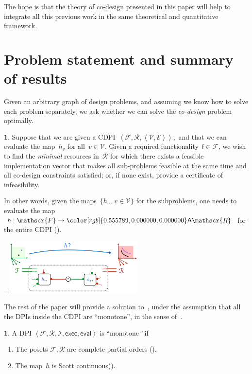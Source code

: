\documentclass[twocolumn,english]{IEEEtran}
\theoremstyle{definition}
\newtheorem{defn}{\protect\definitionname}
\theoremstyle{plain}
\theoremstyle{definition}
\theoremstyle{remark}
\theoremstyle{definition}
\newtheorem{problem}{\protect\problemname}
\theoremstyle{plain}
\theoremstyle{plain}
\newcommand{\aword}[1]{\mathsf{#1}}
\newcommand{\vmath}[1]{\aword{#1}}
\newcommand{\antichains}{\vmath{A}}
\newcommand{\ftor}{{h}}
\newcommand{\funsp}{\mathscr{F}}
\newcommand{\fun}{\vmath{f}}
\newcommand{\impsp}{\mathscr{I}}
\newcommand{\exc}{\vmath{exec}}
\newcommand{\eval}{\vmath{eval}}
\newcommand{\ressp}{\mathscr{R}}
\newcommand{\Aressp}{{\antichains\ressp}}
\newcommand{\colR}{\color[rgb]{0.555789,0.000000,0.000000}}
\newcommand{\cdpiN}{\mathcal{V}}
\newcommand{\cdpin}{v}
\newcommand*{\vcenteredhbox}[1]{\begingroup
\setbox0=\hbox{#1}\parbox{\wd0}{\box0}\endgroup}
\newcommand{\captionsideleft}[2]{
    \medskip
    \begin{minipage}{1.8cm}{
        \hfill
        \protect\captionof{figure}{#1}}\end{minipage}
    \begin{minipage}{6.6cm}
    
    \vcenteredhbox{{#2}}
    \hfill
    \end{minipage}
    \medskip
}
\renewcommand{\Aressp}{{\colR\antichains\ressp}}
\newcommand{\scottcontinuous}{Scott continuous\xspace}
\providecommand{\definitionname}{Definition}
\providecommand{\problemname}{Problem}
\begin{document}
The hope is that the theory of co-design presented in this paper will
help to integrate all this previous work in the same theoretical and
quantitative framework.


\section{Problem statement and summary of results\label{sec:Optimization}}

Given an arbitrary graph of design problems, and assuming we know
how to solve each problem separately, we ask whether we can solve
the \emph{co-design} problem optimally. 
\begin{problem}
\label{prob:MCDP}Suppose that we are given a CDPI~$\left\langle \funsp,\ressp,\left\langle \cdpiN,\mathcal{E}\right\rangle \right\rangle ,$
and that we can evaluate the map~$\ftor_{\cdpin}$ for all~$\cdpin\in\cdpiN$.
Given a required functionality~$\fun\in\funsp$, we wish to find
the \emph{minimal} resources in~$\ressp$ for which there exists
a feasible implementation vector that makes all sub-problems feasible
at the same time and all co-design constraints satisfied; or, if
none exist, provide a certificate of infeasibility. 
\end{problem}
In other words, given the maps~$\{\ftor_{\cdpin},\,\cdpin\in\cdpiN\}$
for the subproblems, one needs to evaluate the map~$\ftor:\funsp\rightarrow\Aressp$
for the entire CDPI (). 

\captionsideleft{\label{fig:question}}{\hspace{-4mm}\includegraphics[width=7cm]{gmcdptro_question}}

The rest of the paper will provide a solution to~,
under the assumption that all the DPIs inside the CDPI are ``monotone'',
in the sense of~.
\begin{defn}
\label{def:DPI-monotone}A DPI $\left\langle \funsp,\ressp,\impsp,\exc,\eval\right\rangle $
is ``monotone\emph{''} if
\begin{enumerate}
\item The posets $\funsp,\ressp$ are complete partial orders ().
\item The map~$\ftor$ is \scottcontinuous ().
\end{enumerate}
\end{defn}
\end{document}
